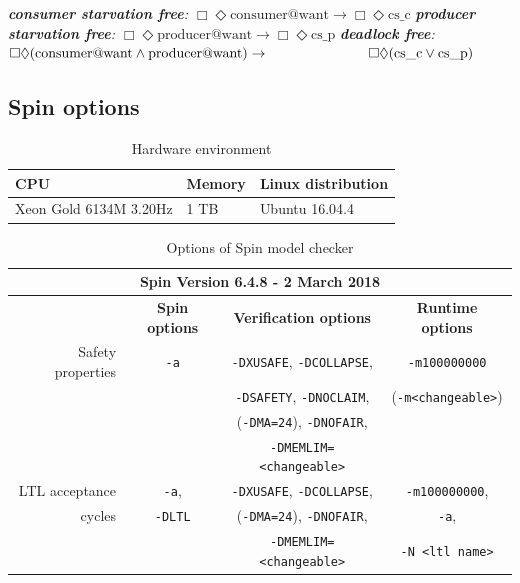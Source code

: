 {\smallbreak\indent\textit{\textbf{consumer starvation free}: $\Box\Diamond\text{consumer@want} \rightarrow\Box\Diamond\text{cs\_c}$}}
{\indent\textit{\textbf{producer starvation free}: $\Box\Diamond\text{producer@want} \rightarrow\Box\Diamond\text{cs\_p}$}}
{\indent\textit{\textbf{deadlock free}: $\Box\Diamond(\text{consumer@want}\wedge\text{producer@want})\rightarrow\hspace*{2.5cm}\Box\Diamond(\text{cs\_c}\vee\text{cs\_p})$}}

\subsection{Spin options} 

\begin{table}
\caption{Hardware environment}
\label{tab:env}
\begin{tabular}{lll}
\toprule
CPU & Memory & Linux distribution \\
\hline
Xeon Gold 6134M 3.20Hz & 1 TB & Ubuntu 16.04.4 \\
\bottomrule
\end{tabular}
\end{table}

\begin{table}
\caption{Options of Spin model checker}
\label{tab:spinv}
\begin{tabular}{rccc}
\toprule
\multicolumn{4}{c}{Spin Version 6.4.8 - 2 March 2018} \\
\midrule
 & \textbf{Spin options} & \textbf{Verification options} & \textbf{Runtime options} \\
 \cmidrule{2-4}
Safety properties & \texttt{-a} & \texttt{-DXUSAFE}, \texttt{-DCOLLAPSE}, & \texttt{-m100000000} \\
& & \texttt{-DSAFETY}, \texttt{-DNOCLAIM}, & (\texttt{-m<changeable>}) \\
& & (\texttt{-DMA=24}), \texttt{-DNOFAIR}, & \\
& & \texttt{-DMEMLIM=<changeable>} & \\
\cmidrule{2-4}
LTL acceptance & \texttt{-a}, & \texttt{-DXUSAFE}, \texttt{-DCOLLAPSE}, & \texttt{-m100000000}, \\
cycles & \texttt{-DLTL} & (\texttt{-DMA=24}), \texttt{-DNOFAIR}, & \texttt{-a}, \\
& & \texttt{-DMEMLIM=<changeable>} & \texttt{-N <ltl name>} \\
\bottomrule
\end{tabular}
\end{table}


